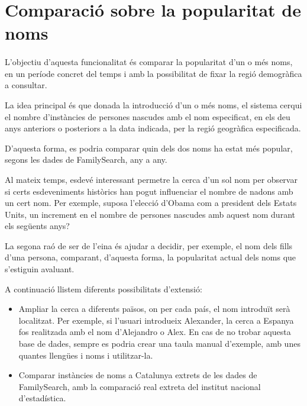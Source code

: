 \section{Comparació sobre la popularitat de noms}

    \paragraph{}
    L'objectiu d'aquesta funcionalitat és comparar la popularitat d'un o més noms, en un període concret del temps i amb la possibilitat de fixar la regió demogràfica a consultar.

    La idea principal és que donada la introducció d'un o més noms, el sistema cerqui el nombre d'instàncies de persones nascudes amb el nom especificat, en els deu anys anteriors o posteriors a la data indicada, per la regió geogràfica especificada.

    D'aquesta forma, es podria comparar quin dels dos noms ha estat més popular, segons les dades de FamilySearch, any a any.

    Al mateix temps, esdevé interessant permetre la cerca d'un sol nom per observar si certs esdeveniments històrics han pogut influenciar el nombre de nadons amb un cert nom. Per exemple, suposa l'elecció d'Obama com a president dels Estats Units, un increment en el nombre de persones nascudes amb aquest nom durant els següents anys?

    La segona raó de ser de l'eina és ajudar a decidir, per exemple, el nom dels fills d'una persona, comparant, d'aquesta forma, la popularitat actual dels noms que s'estiguin avaluant.

    A continuació llistem diferents possibilitats d'extensió:

    \begin{itemize}
        \item Ampliar la cerca a diferents països, on per cada país, el nom introduït serà localitzat. Per exemple, si l'usuari introdueix Alexander, la cerca a Espanya fos realitzada amb el nom d'Alejandro o Alex. En cas de no trobar aquesta base de dades, sempre es podria crear una taula manual d'exemple, amb unes quantes llengües i noms i utilitzar-la.
        \item Comparar instàncies de noms a Catalunya extrets de les dades de FamilySearch, amb la comparació real extreta del institut nacional d'estadística.
    \end{itemize}
